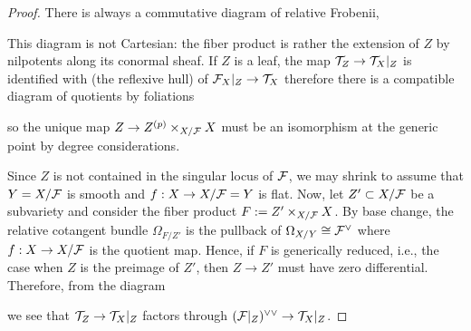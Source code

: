 \documentclass[main.tex]{subfiles}
\begin{document}
\begin{proof}
There is always a commutative diagram of relative Frobenii,
\begin{center}
\end{center}
This diagram is not Cartesian: the fiber product is rather the extension of $Z$ by nilpotents along its conormal sheaf. If $Z$ is a leaf, the map $\mathcal{T}_Z \to \mathcal{T}_X|_Z$ is identified with (the reflexive hull) of $\mathcal{F}_X|_Z \to \mathcal{T}_X$ therefore there is a compatible diagram of quotients by foliations
\begin{center}
\end{center}
so the unique map $Z \to Z^{(p)} \times_{X / \mathcal{F}} X$ must be an isomorphism at the generic point by degree considerations. 
\par 
Since $Z$ is not contained in the singular locus of $\mathcal{F}$, we may shrink to assume that $Y = X / \mathcal{F}$ is smooth and $f : X \to X / \mathcal{F} = Y$ is flat. Now, let $Z' \subset X / \mathcal{F}$ be a subvariety and consider the fiber product $F := Z' \times_{X / \mathcal{F}} X$. By base change, the relative cotangent bundle $\Omega_{F/Z'}$ is the pullback of $\Omega_{X/Y} \cong \mathcal{F}^{\vee}$ where $f : X \to X / \mathcal{F}$ is the quotient map. Hence, if $F$ is generically reduced, i.e., the case when $Z$ is the preimage of $Z'$, then $Z \to Z'$ must have zero differential. Therefore, from the diagram
\begin{center}
\end{center}
we see that $\mathcal{T}_Z \to \mathcal{T}_X|_Z$ factors through $(\mathcal{F}|_Z)^{\vee \vee} \to \mathcal{T}_X|_Z$. 
\end{proof}




\ifSubfilesClassLoaded{%
  
  
}{}
\end{document}

